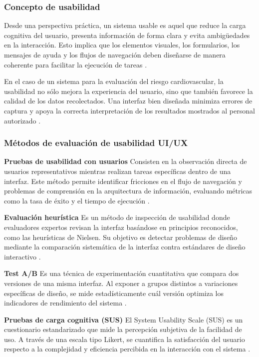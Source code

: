 \subsubsection{Concepto de usabilidad}

Desde una perspectiva práctica, un sistema usable es aquel que reduce la carga cognitiva del usuario, presenta información de forma clara y evita ambigüedades en la interacción. Esto implica que los elementos visuales, los formularios, los mensajes de ayuda y los flujos de navegación deben diseñarse de manera coherente para facilitar la ejecución de tareas \cite{mdn2025accessibility}.

En el caso de un sistema para la evaluación del riesgo cardiovascular, la usabilidad no sólo mejora la experiencia del usuario, sino que también favorece la calidad de los datos recolectados. Una interfaz bien diseñada minimiza errores de captura y apoya la correcta interpretación de los resultados mostrados al personal autorizado \cite{mdn2025accessibility,who2025digitalhealth}.

\subsubsection{Métodos de evaluación de usabilidad UI/UX}

\textbf{Pruebas de usabilidad con usuarios}
Consisten en la observación directa de usuarios representativos mientras realizan tareas específicas dentro de una interfaz. Este método permite identificar fricciones en el flujo de navegación y problemas de comprensión en la arquitectura de información, evaluando métricas como la tasa de éxito y el tiempo de ejecución \cite{bargas2023usability}.

\textbf{Evaluación heurística}
Es un método de inspección de usabilidad donde evaluadores expertos revisan la interfaz basándose en principios reconocidos, como las heurísticas de Nielsen. Su objetivo es detectar problemas de diseño mediante la comparación sistemática de la interfaz contra estándares de diseño interactivo \cite{molich2022heuristic}.

\textbf{Test A/B}
Es una técnica de experimentación cuantitativa que compara dos versiones de una misma interfaz. Al exponer a grupos distintos a variaciones específicas de diseño, se mide estadísticamente cuál versión optimiza los indicadores de rendimiento del sistema \cite{kohavi2023abtesting}.

\textbf{Pruebas de carga cognitiva (SUS)}
El System Usability Scale (SUS) es un cuestionario estandarizado que mide la percepción subjetiva de la facilidad de uso. A través de una escala tipo Likert, se cuantifica la satisfacción del usuario respecto a la complejidad y eficiencia percibida en la interacción con el sistema \cite{bangor2024sus}.

